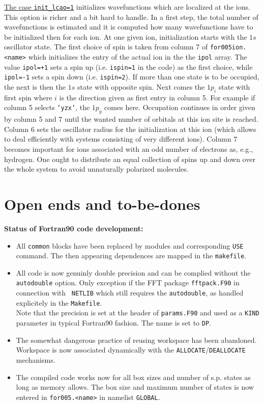 \documentclass[12pt]{article}
\begin{document}
\underline{The case {\tt init\_lcao=1}} initializes wavefunctions
which are localized at the ions. This option is richer and a bit hard
to handle. In a first step, the total number of wavefunctions is
estimated and it is computed how many wavefunctions have to be
initialized then for each ion. At one given ion, initialization starts
with the $1s$ oscillator state. The first choice of spin is taken from
column 7 of {\tt for005ion.<name>} {which initializes the entry of the
  actual ion in the the {\tt ipol}
array. The value {\tt ipol=+1} sets a spin up (i.e. {\tt ispin=1} in
the code) as the first choice, 
while {\tt ipol=-1} sets a spin down (i.e. {\tt ispin=2}).} If more than one state is to be
occupied, the next is then the $1s$ state with opposite spin. Next
comes the $1p_i$ state with first spin where $i$ is the direction
given as first entry in column 5. For example if column 5 selects
{\tt 'yzx'}, the $1p_y$ comes here. Occupation continues in order
given by column 5 and 7 until the wanted number of orbitals at this
ion site is reached. Column 6 sets the oscillator radius for the
initialization at this ion (which allows to deal efficiently with
systems consisting of very different ions). Column 7 becomes important
for ions associated with an odd number of electrons as, e.g.,
hydrogen. One ought to distribute an equal collection of 
{spins up and down over the whole system} to avoid unnaturally 
polarized molecules.

\newpage

\section{Open ends and to-be-dones}

{\Large\bf Status of Fortran90 code development:}
\begin{itemize}
  \item 
    All {\tt common} blocks have been replaced by modules
    and corresponding {\tt USE} command. The then appearing
    dependences are mapped in the {\tt makefile}.
  \item
    All code is now genuinly double precision and can be
    complied without the {\tt autodouble} option. Only exception
    if the FFT package {\tt fftpack.F90} in connection with {\tt
      NETLIB}
    which still requires
    the  {\tt autodouble}, as handled explicitely in the
    {\tt Makefile}.
    \\
    Note that the precision is set at the header of {\tt params.F90}
    and used as a {\tt KIND} parameter in typical Fortran90 fashion.
    The name is set to {\tt DP}.
  \item
    The somewhat dangerous practice of reusing workspace has been
    abandoned. Workspace is now associated dynamically with
    the {\tt ALLOCATE}/{\tt DEALLOCATE} mechanisms.
  \item
    The compiled code works now for all box sizes and number of s.p.
    states as long as memory allows. The box size and maximum number
    of states is now entered in {\tt for005.<name>} in namelist
    {\tt GLOBAL}.
\end{itemize}
\end{document}
